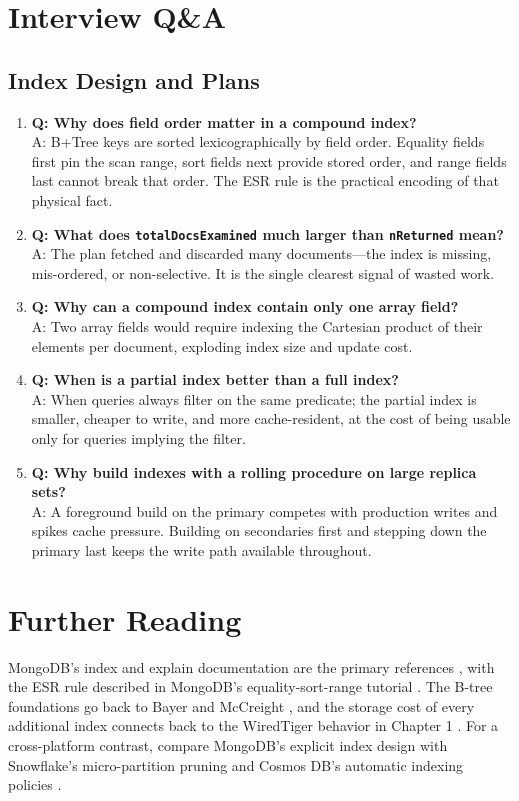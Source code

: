 \section{Interview Q\&A}
\subsection{Index Design and Plans}
\begin{enumerate}
    \item \textbf{Q: Why does field order matter in a compound index?}\\
    A: B+Tree keys are sorted lexicographically by field order. Equality fields first pin the scan range, sort fields next provide stored order, and range fields last cannot break that order. The ESR rule is the practical encoding of that physical fact.

    \item \textbf{Q: What does \texttt{totalDocsExamined} much larger than \texttt{nReturned} mean?}\\
    A: The plan fetched and discarded many documents---the index is missing, mis-ordered, or non-selective. It is the single clearest signal of wasted work.

    \item \textbf{Q: Why can a compound index contain only one array field?}\\
    A: Two array fields would require indexing the Cartesian product of their elements per document, exploding index size and update cost.

    \item \textbf{Q: When is a partial index better than a full index?}\\
    A: When queries always filter on the same predicate; the partial index is smaller, cheaper to write, and more cache-resident, at the cost of being usable only for queries implying the filter.

    \item \textbf{Q: Why build indexes with a rolling procedure on large replica sets?}\\
    A: A foreground build on the primary competes with production writes and spikes cache pressure. Building on secondaries first and stepping down the primary last keeps the write path available throughout.
\end{enumerate}

\section{Further Reading}
MongoDB's index and explain documentation are the primary references \cite{mongodbIndexesDocs,mongodbExplainDocs}, with the ESR rule described in MongoDB's equality-sort-range tutorial \cite{mongodbESRDocs}. The B-tree foundations go back to Bayer and McCreight \cite{bayer1972organization}, and the storage cost of every additional index connects back to the WiredTiger behavior in Chapter 1 \cite{mongodbWiredTigerDocs}. For a cross-platform contrast, compare MongoDB's explicit index design with Snowflake's micro-partition pruning \cite{snowflakeSemiStructuredDocs} and Cosmos DB's automatic indexing policies \cite{cosmosPartitionDocs}.

